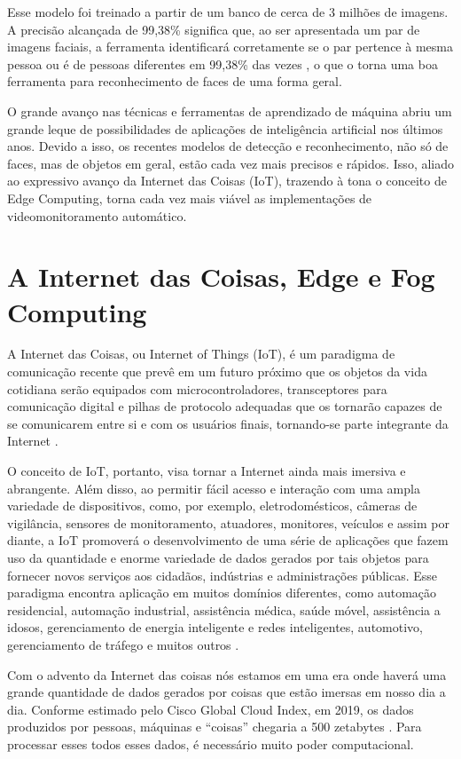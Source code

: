 Esse modelo foi treinado a partir de um banco de cerca de 3 milhões de imagens. A precisão alcançada de 99,38\% significa que, ao ser apresentada um par de imagens faciais, a ferramenta identificará corretamente se o par pertence à mesma pessoa ou é de pessoas diferentes  em 99,38\% das vezes \cite{Dlib}, o que o torna uma boa ferramenta para reconhecimento de faces de uma forma geral.

O grande avanço nas técnicas e ferramentas de aprendizado de máquina abriu um grande leque de possibilidades de aplicações de inteligência artificial nos últimos anos. Devido a isso, os recentes modelos de detecção e reconhecimento, não só de faces, mas de objetos em geral, estão cada vez mais precisos e rápidos. Isso, aliado ao expressivo avanço da Internet das Coisas (IoT), trazendo à tona o conceito de Edge Computing, torna cada vez mais viável as implementações de videomonitoramento automático.


\section{A Internet das Coisas, Edge e Fog Computing}

A Internet das Coisas, ou Internet of Things (IoT), é um paradigma de comunicação recente que prevê em um futuro próximo que os objetos da vida cotidiana serão equipados com microcontroladores, transceptores para comunicação digital e pilhas de protocolo adequadas que os tornarão capazes de se comunicarem entre si e com os usuários finais, tornando-se parte integrante da Internet \cite{Atzori2010}.

O conceito de IoT, portanto, visa tornar a Internet ainda mais imersiva e abrangente. Além disso, ao permitir fácil acesso e interação com uma ampla variedade de dispositivos, como, por exemplo, eletrodomésticos, câmeras de vigilância, sensores de monitoramento, atuadores, monitores, veículos e assim por diante, a IoT promoverá o desenvolvimento de uma série de aplicações que fazem uso da quantidade e enorme variedade de dados gerados por tais objetos para fornecer novos serviços aos cidadãos, indústrias e administrações públicas. Esse paradigma encontra aplicação em muitos domínios diferentes, como automação residencial, automação industrial, assistência médica, saúde móvel, assistência a idosos, gerenciamento de energia inteligente e redes inteligentes, automotivo, gerenciamento de tráfego e muitos outros \cite{Bellavista2013}.

Com o advento da Internet das coisas nós estamos em uma era onde haverá uma grande quantidade de dados gerados por coisas que estão imersas em nosso dia a dia. Conforme estimado pelo Cisco Global Cloud Index, em 2019, os dados produzidos por pessoas, máquinas e “coisas” chegaria a 500 zetabytes \cite{Cisco2016}. Para processar esses todos esses dados, é necessário muito poder computacional.

